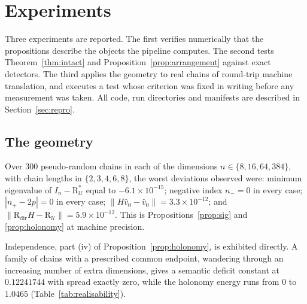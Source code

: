 \documentclass{article}
\theoremstyle{plain}
\theoremstyle{definition}
\numberwithin{equation}{section}
\newcommand{\Uc}{\mathcal{U}}
\begin{document}
\section{Experiments}\label{sec:experiments}

Three experiments are reported. The first verifies numerically that the
propositions describe the objects the pipeline computes. The second
tests Theorem~\ref{thm:intact} and Proposition~\ref{prop:arrangement}
against exact detectors. The third applies the geometry to real chains
of round-trip machine translation, and executes a test whose criterion
was fixed in writing before any measurement was taken. All code, run
directories and manifests are described in Section~\ref{sec:repro}.

\subsection{The geometry}

Over $300$ pseudo-random chains in each of the dimensions
$n \in \{8,16,64,384\}$, with chain lengths in $\{2,3,4,6,8\}$, the
worst deviations observed were: minimum eigenvalue of
$I_n - \mathrm{R}^{*}_\Uc$ equal to $-6.1\times10^{-15}$; negative index
$n_- = 0$ in every case; $|n_+ - 2p| = 0$ in every case;
$\|H\hat{v}_0-\hat{v}_0\| = 3.3\times10^{-12}$; and
$\|\mathrm{R}_{\mathrm{dir}}H - \mathrm{R}_\Uc\| = 5.9\times10^{-12}$. This is
Propositions~\ref{prop:sig} and \ref{prop:holonomy} at machine
precision.

Independence, part (iv) of Proposition~\ref{prop:holonomy}, is
exhibited directly. A family of chains with a prescribed common
endpoint, wandering through an increasing number of extra dimensions,
gives a semantic deficit constant at $0.12241744$ with spread exactly
zero, while the holonomy energy runs from $0$ to $1.0465$
(Table~\ref{tab:realisability}).
\end{document}
